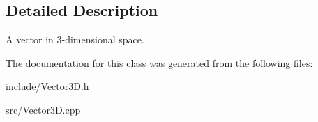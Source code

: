 \subsection{Detailed Description}
A vector in 3-\/dimensional space. 

The documentation for this class was generated from the following files\+:\begin{DoxyCompactItemize}
\item 
include/Vector3\+D.\+h\item 
src/Vector3\+D.\+cpp\end{DoxyCompactItemize}
